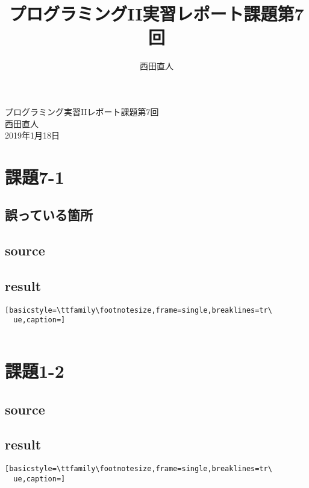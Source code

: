 \documentclass[10pt,a4paper]{jsarticle}
\title{プログラミングII実習レポート課題第7回}
\author{西田直人}
\begin{document}
\begin{center}
{\LARGE プログラミング実習IIレポート課題第7回} \\
\large
西田直人 \\ 2019年1月18日
\end{center}
\normalsize
\section{課題7-1}
\subsection{誤っている箇所}

\subsection{source}


\subsection{result}

\begin{lstlisting}[basicstyle=\ttfamily\footnotesize,frame=single,breaklines=tr\
  ue,caption=]
     
\end{lstlisting}


\section{課題1-2}

\subsection{source}



\subsection{result}
\begin{lstlisting}[basicstyle=\ttfamily\footnotesize,frame=single,breaklines=tr\
  ue,caption=]
  
\end{lstlisting}
\end{document}
